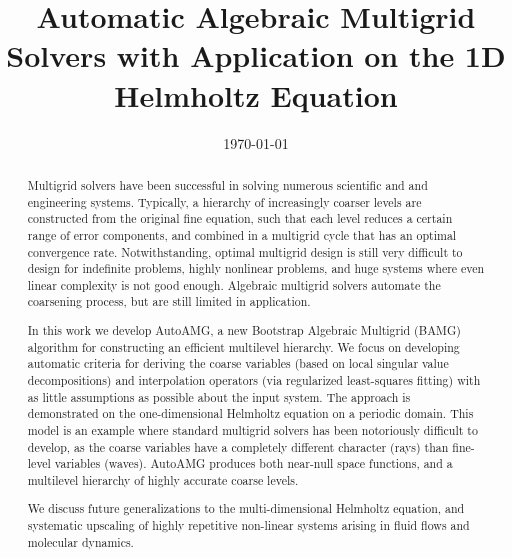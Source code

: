 \documentclass{article}
\title{Automatic Algebraic Multigrid Solvers with Application on the 1D Helmholtz Equation}
\author{}
\date{\today}
\begin{document}
\maketitle

\begin{abstract}
Multigrid solvers have been successful in solving numerous scientific and and engineering systems. Typically, a hierarchy of increasingly coarser levels are constructed from the original fine equation, such that each level reduces a certain range of error components, and combined in a multigrid cycle that has an optimal convergence rate. Notwithstanding, optimal multigrid design is still very difficult to design for indefinite problems, highly nonlinear problems, and huge systems where even linear complexity is not good enough. Algebraic multigrid solvers automate the coarsening process, but are still limited in application.

In this work we develop AutoAMG, a new Bootstrap Algebraic Multigrid (BAMG) algorithm for constructing an efficient multilevel hierarchy. We focus on developing automatic criteria for deriving the coarse variables (based on local singular value decompositions) and interpolation operators (via regularized least-squares fitting) with as little assumptions as possible about the input system. The approach is demonstrated on the one-dimensional Helmholtz equation on a periodic domain. This model is an example where standard multigrid solvers has been notoriously difficult to develop, as the coarse variables have a completely different character (rays) than fine-level variables (waves). AutoAMG produces both near-null space functions, and a multilevel hierarchy of highly accurate coarse levels.

We discuss future generalizations to the multi-dimensional Helmholtz equation, and  systematic upscaling of highly repetitive non-linear systems arising in fluid flows and molecular dynamics.
\end{abstract}
\end{document}
